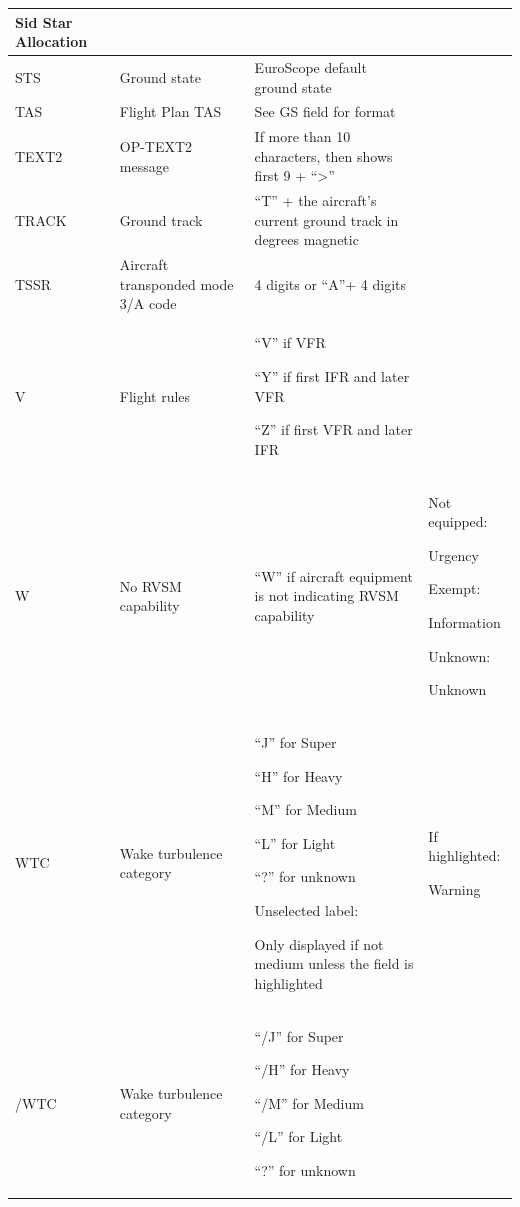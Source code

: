 \documentclass[11pt,a4paper]{memoir}
\begin{document}
\begin{longtable}{|p{2.5cm}|p{2.5cm}|p{4.5cm}|p{4.5cm}|}
      Sid Star Allocation \\ \hline
    STS &
      Ground state &
      EuroScope default ground state &
       \\ \hline
    TAS &
      Flight Plan TAS &
      See GS field for format &
       \\ \hline
    TEXT2 &
      OP-TEXT2 message &
      If more than 10 characters, then shows first 9 + “>” &
       \\ \hline
    TRACK &
      Ground track &
      “T” + the aircraft’s current ground track in degrees magnetic &
       \\ \hline
    TSSR &
      Aircraft transponded  mode 3/A code &
      4 digits or “A”+ 4 digits &
       \\ \hline
    V &
      Flight rules &
      “V” if VFR
      
      “Y” if first IFR and later VFR
      
      “Z” if first VFR and later IFR &
       \\ \hline
    W &
      No RVSM capability &
      “W” if aircraft equipment is not  indicating RVSM capability &
      Not equipped: 
      
      Urgency 
      \bigskip
      
      Exempt: 
      
      Information 
      \bigskip
      
      Unknown: 
      
      Unknown \\ \hline
    WTC &
      Wake turbulence  category &
      “J” for Super
      
      “H” for Heavy
      
      “M” for Medium
      
      “L” for Light 
      
      “?” for unknown 
      \bigskip
      
      Unselected label: 
      
      Only displayed if not medium unless the field is highlighted &
      If highlighted: 
      
      Warning \\ \hline
    /WTC &
      Wake turbulence  category &
      “/J” for Super
      
      “/H” for Heavy
      
      “/M” for Medium
      
      “/L” for Light 
      
      “?” for unknown 
      \bigskip
      

\end{longtable}
\end{document}
